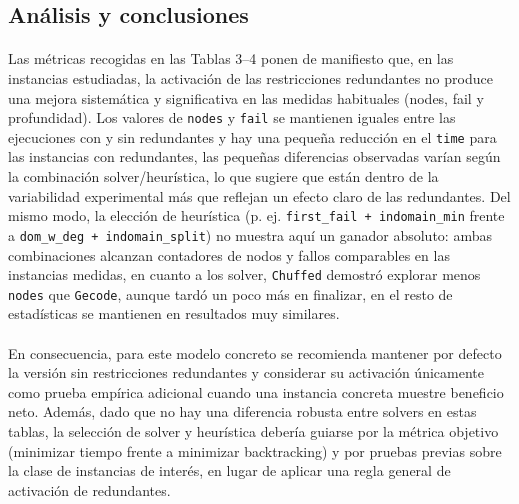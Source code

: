 
\subsection{Análisis y conclusiones}\label{sec:02-kakuro-analisis}

\paragraph{}
Las métricas recogidas en las Tablas 3–4 ponen de manifiesto que, en las instancias estudiadas, la activación de las restricciones redundantes no produce una mejora sistemática y significativa en las medidas habituales (nodes, fail y profundidad). Los valores de \texttt{nodes} y \texttt{fail} se mantienen iguales entre las ejecuciones con y sin redundantes y hay una pequeña reducción en el \texttt{time} para las instancias con redundantes, las pequeñas diferencias observadas varían según la combinación solver/heurística, lo que sugiere que están dentro de la variabilidad experimental más que reflejan un efecto claro de las redundantes. Del mismo modo, la elección de heurística (p. ej. \texttt{first\_fail + indomain\_min} frente a \texttt{dom\_w\_deg + indomain\_split}) no muestra aquí un ganador absoluto: ambas combinaciones alcanzan contadores de nodos y fallos comparables en las instancias medidas, en cuanto a los solver, \texttt{Chuffed} demostró explorar menos \texttt{nodes} que \texttt{Gecode}, aunque tardó un poco más en finalizar, en el resto de estadísticas se mantienen en resultados muy similares.

\paragraph{}
En consecuencia, para este modelo concreto se recomienda mantener por defecto la versión sin restricciones redundantes y considerar su activación únicamente como prueba empírica adicional cuando una instancia concreta muestre beneficio neto. Además, dado que no hay una diferencia robusta entre solvers en estas tablas, la selección de solver y heurística debería guiarse por la métrica objetivo (minimizar tiempo frente a minimizar backtracking) y por pruebas previas sobre la clase de instancias de interés, en lugar de aplicar una regla general de activación de redundantes.

